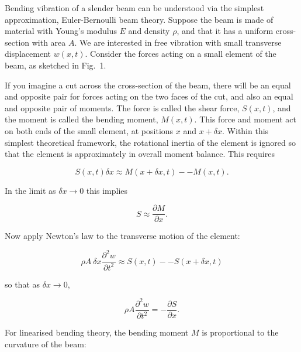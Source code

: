  Bending vibration of a slender beam can be understood via the simplest 
  approximation, Euler-Bernoulli beam theory. Suppose the beam is made of 
  material with Young's modulus $E$ and density $\rho$, and that it has a 
  uniform cross-section with area $A$. We are interested in free vibration with 
  small transverse displacement $w(x,t)$. Consider the forces acting on a small 
  element of the beam, as sketched in Fig.\ 1. 


  If you imagine a cut across the cross-section of the beam, there will be an 
  equal and opposite pair for forces acting on the two faces of the cut, and 
  also an equal and opposite pair of moments. The force is called the shear 
  force, $S(x,t)$, and the moment is called the bending moment, $M(x,t)$. This 
  force and moment act on both ends of the small element, at positions $x$ and 
  $x + \delta x$. Within this simplest theoretical framework, the rotational 
  inertia of the element is ignored so that the element is approximately in 
  overall moment balance. This requires 

  \begin{equation*}S(x,t) \delta x \approx M(x+ \delta x,t) -- M(x,t). 
  \tag{1}\end{equation*} 

  In the limit as $\delta x \rightarrow 0$ this implies 

  \begin{equation*}S \approx \dfrac{\partial M}{\partial x} . 
  \tag{2}\end{equation*} 

  Now apply Newton's law to the transverse motion of the element: 

  \begin{equation*}\rho A ~\delta x \dfrac{\partial^2 w}{\partial t^2} \approx 
  S(x,t) -- S(x+\delta x,t) \tag{3}\end{equation*} 

  \noindent{}so that as $\delta x \rightarrow 0$, 

  \begin{equation*}\rho A \dfrac{\partial^2 w}{\partial t^2} = -\dfrac{\partial 
  S}{\partial x}. \tag{4}\end{equation*} 

  For linearised bending theory, the bending moment $M$ is proportional to the 
  curvature of the beam: 

